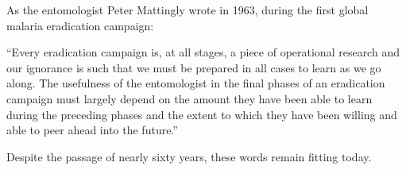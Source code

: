 \documentclass[a4paper,11pt,abstracton,hidelinks]{scrartcl}
\begin{document}
As the entomologist Peter Mattingly wrote in 1963, during the first global malaria eradication campaign:


\begin{displayquote}
``Every eradication campaign is, at all stages, a piece of operational research and our ignorance is such that we must be prepared in all cases to learn as we go along. The usefulness of the entomologist in the final phases of an eradication campaign must largely depend on the amount they have been able to learn during the preceding phases and the extent to which they have been willing and able to peer ahead into the future.''
\end{displayquote}


Despite the passage of nearly sixty years, these words remain fitting today.


\printbibliography
\end{document}
